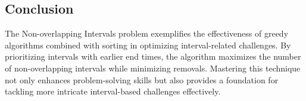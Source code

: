 \subsection*{Conclusion}
The Non-overlapping Intervals problem exemplifies the effectiveness of greedy algorithms combined with sorting in optimizing interval-related challenges. By prioritizing intervals with earlier end times, the algorithm maximizes the number of non-overlapping intervals while minimizing removals. Mastering this technique not only enhances problem-solving skills but also provides a foundation for tackling more intricate interval-based challenges effectively.